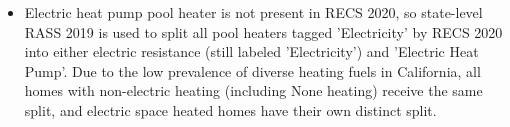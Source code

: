 \begin{itemize}
\item Electric heat pump pool heater is not present in RECS 2020, so state-level RASS 2019 is used to split all pool heaters tagged 'Electricity' by RECS 2020 into either electric resistance (still labeled 'Electricity') and 'Electric Heat Pump'. Due to the low prevalence of diverse heating fuels in California, all homes with non-electric heating (including None heating) receive the same split, and electric space heated homes have their own distinct split.
\end{itemize}
